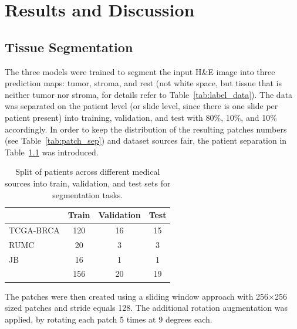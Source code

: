 \chapter{Results and Discussion}
\section{Tissue Segmentation}
The three models were trained to segment the input H\&E image into three prediction maps:
tumor, stroma, and rest (not white space, but tissue that is neither tumor nor stroma,
for details refer to Table~\ref*{tab:label_data}). The data was separated on the patient
level (or slide level, since there is one slide per patient present)
into training, validation, and test with 80\%, 10\%, and 10\% accordingly.
In order to keep the distribution of the resulting patches numbers (see Table~\ref*{tab:patch_sep})
and dataset sources fair, the patient separation in Table~\ref*{tab:patients_sep} was introduced.

\begin{table}[h!]
    \centering
    \begin{tabular}{ l c c c }
        \hline
        & Train & Validation & Test \\
        \hline
        TCGA-BRCA & 120 & 16 & 15 \\
        RUMC & 20 & 3 & 3 \\
        JB & 16 & 1 & 1 \\
        \hline
        & 156 & 20 & 19 \\
    \end{tabular}
\caption{\label{tab:patients_sep} Split of patients across different medical sources
into train, validation, and test sets for segmentation tasks.}
\end{table}

The patches were then created using a sliding window approach with 256$\times$256 sized patches
and stride equals 128. The additional rotation augmentation was applied, by rotating each patch
5 times at 9 degrees each.

